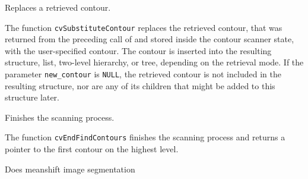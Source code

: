 Replaces a retrieved contour.


\begin{description}
\end{description}

The function \texttt{cvSubstituteContour} replaces the retrieved
contour, that was returned from the preceding call of
 and stored inside the contour scanner
state, with the user-specified contour. The contour is inserted
into the resulting structure, list, two-level hierarchy, or tree,
depending on the retrieval mode. If the parameter \texttt{new\_contour}
is \texttt{NULL}, the retrieved contour is not included in the
resulting structure, nor are any of its children that might be added
to this structure later.

\label{EndFindContours}

Finishes the scanning process.


\begin{description}
\end{description}

The function \texttt{cvEndFindContours} finishes the scanning process and returns a pointer to the first contour on the highest level.


Does meanshift image segmentation


